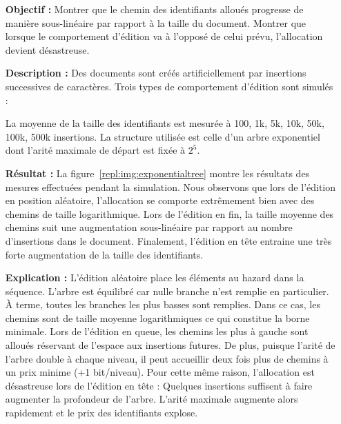 \begin{itemize}
\item [\textbf{Objectif :}] Montrer que le chemin des identifiants alloués
  progresse de manière sous-linéaire par rapport à la taille du
  document. Montrer que lorsque le comportement d'édition va à l'opposé de celui
  prévu, l'allocation devient désastreuse.
\item [\textbf{Description :}] Des documents sont créés artificiellement par
  insertions successives de caractères. Trois types de comportement d'édition
  sont simulés :
  La moyenne de la taille des identifiants est mesurée à 100, 1k, 5k, 10k, 50k,
  100k, 500k insertions. La structure utilisée est celle d'un arbre exponentiel
  dont l'arité maximale de départ est fixée à $2^5$.
\item [\textbf{Résultat :}] La figure~\ref{repl:img:exponentialtree} montre les
  résultats des mesures effectuées pendant la simulation. Nous observons que
  lors de l'édition en position aléatoire, l'allocation se comporte extrêmement
  bien avec des chemins de taille logarithmique. Lors de l'édition en fin, la
  taille moyenne des chemins suit une augmentation sous-linéaire par rapport au
  nombre d'insertions dans le document. Finalement, l'édition en tête entraine
  une très forte augmentation de la taille des identifiants.
\item [\textbf{Explication :}] L'édition aléatoire place les éléments au hazard
  dans la séquence. L'arbre est équilibré car nulle branche n'est remplie en
  particulier. À terme, toutes les branches les plus basses sont remplies. Dans
  ce cas, les chemins sont de taille moyenne logarithmiques ce qui constitue la
  borne minimale. Lors de l'édition en queue, les chemins les plus à gauche sont
  alloués réservant de l'espace aux insertions futures. De plus, puisque l'arité
  de l'arbre double à chaque niveau, il peut accueillir deux fois plus de
  chemins à un prix minime (+1 bit/niveau). Pour cette même raison, l'allocation
  est désastreuse lors de l'édition en tête : Quelques insertions suffisent à
  faire augmenter la profondeur de l'arbre. L'arité maximale augmente alors
  rapidement et le prix des identifiants explose.
\end{itemize}


